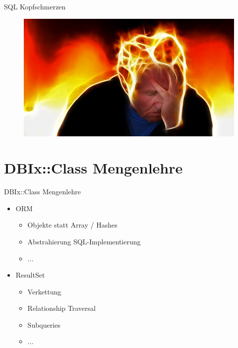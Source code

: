 \begin{frame}{SQL Kopfschmerzen}
\begin{figure}[!ht]
\centering
\includegraphics[width=1\linewidth]{img/stress.jpg}
\end{figure}
\end{frame}

\section{DBIx::Class Mengenlehre}


\begin{frame}{DBIx::Class Mengenlehre}
\begin{itemize}
\item ORM
\begin{itemize}
\item Objekte statt Array / Hashes
\item Abstrahierung SQL-Implementierung
\item ...
\end{itemize}

\item ResultSet
\begin{itemize}
\item Verkettung
\item Relationship Traversal
\item Subqueries
\item ...
\end{itemize}
\end{itemize}
\end{frame}

